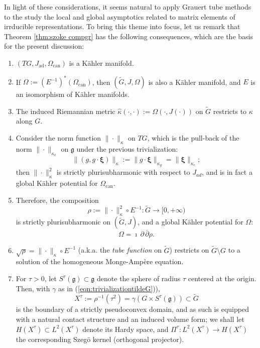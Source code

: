 \documentclass[12pt,a4paper]{article}
\theoremstyle{plain}
\theoremstyle{definition}
\begin{document}
In light of these considerations, 
it seems natural to apply Grauert tube methods to 
the study the local and global 
asymptotics related to matrix elements
of irrducible representations.
To bring this theme into focus,
let us remark that Theorem 
\ref{thm:szoke compgr} has the following consequences, which are the basis for the present discussion:
\begin{enumerate}
\item $(TG,J_{\mathrm{ad}},\Omega_{\mathrm{can}})$
is a K\"{a}hler manifold.
\item If
$
\Omega:=(E^{-1})^*(\Omega_{\mathrm{can}})
$,
then $(\tilde{G},J,\Omega)$ is also a K\"{a}hler manifold,
and $E$ is an isomorphism of K\"{a}hler manifolds.

\item The induced Riemannian metric 
$\hat{\kappa}(\cdot,\cdot):=\Omega(\cdot, J(\cdot))$ on $\tilde{G}$ restricts
to $\kappa$ along $G$.

\item Consider the norm function $\|\cdot\|_\kappa$ on $TG$, which 
is the pull-back of the norm $\|\cdot\|_{\kappa_e}$ 
on $\mathfrak{g}$ under the previous trivialization:
$$
\|(g,g\cdot \boldsymbol{\xi})\|_\kappa:=
\|g\cdot \boldsymbol{\xi}\|_{\kappa_g}
=\|\boldsymbol{\xi}\|_{\kappa_e};
$$
then $\|\cdot\|_\kappa^2$ is strictly plurisubharmonic 
with respect to $J_{ad}$, and is in fact a global
K\"{a}hler potential for $\Omega_{\mathrm{can}}$. 

\item Therefore, the composition
\begin{equation}
\label{eqn:defn di rho}
\rho:=\|\cdot\|_\kappa^2\circ E^{-1}:
\tilde{G}\rightarrow [0,+\infty)
\end{equation}
%
is strictly plurisubharmonic  on $(\tilde{G},J)$, and a global
K\"{a}hler potential for $\Omega$:
$$
\Omega=\imath\,\partial\,\overline{\partial}\rho.
$$

\item $\sqrt{\rho}=\|\cdot\|_\kappa\circ E^{-1}$
(a.k.a. the \textit{tube function} on $\tilde{G}$) restricts on $\tilde{G}\setminus G$ to a solution of the homogeneous Monge-Amp\`{e}re
equation.

\item For $\tau>0$, let 
$S^\tau(\mathfrak{g})\subset \mathfrak{g}$
denote the sphere of radius $\tau$ centered at the origin.
Then,
with $\gamma$ as in (\ref{eqn:trivializationtildeG})),
\begin{equation}
\label{eqn:X tau sphere bundle}
X^\tau:=\rho^{-1}(\tau^2)=\gamma\left(G\times S^\tau(\mathfrak{g})\right)
\subset \tilde{G}
\end{equation}
%
is the boundary of a strictly pseudoconvex domain, and as such is
equipped with a natural contact structure and an induced 
volume form; we shall let $H(X^\tau)
\subset L^2(X^\tau)$
denote its Hardy space, and $\Pi^\tau:L^2(X^\tau)\rightarrow H(X^\tau)$ the corresponding
Szeg\"{o} kernel (orthogonal projector).


\end{enumerate}
 
\end{document}
